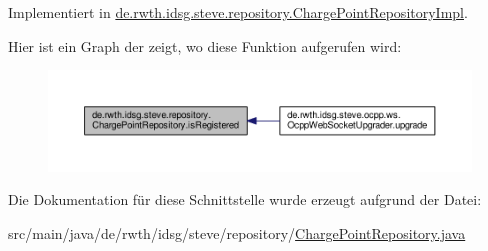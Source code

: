 Implementiert in \hyperlink{classde_1_1rwth_1_1idsg_1_1steve_1_1repository_1_1_charge_point_repository_impl_a4ae3e76c34f39cf6e72f48d608b6d511}{de.\-rwth.\-idsg.\-steve.\-repository.\-Charge\-Point\-Repository\-Impl}.



Hier ist ein Graph der zeigt, wo diese Funktion aufgerufen wird\-:
\nopagebreak
\begin{figure}[H]
\begin{center}
\leavevmode
\includegraphics[width=350pt]{interfacede_1_1rwth_1_1idsg_1_1steve_1_1repository_1_1_charge_point_repository_a4824062c6ff2dfcf9490ffb71484bb83_icgraph}
\end{center}
\end{figure}




Die Dokumentation für diese Schnittstelle wurde erzeugt aufgrund der Datei\-:\begin{DoxyCompactItemize}
\item 
src/main/java/de/rwth/idsg/steve/repository/\hyperlink{_charge_point_repository_8java}{Charge\-Point\-Repository.\-java}\end{DoxyCompactItemize}
